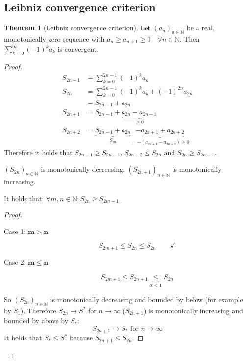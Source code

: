 \documentclass[a4paper,landscape,twocolumn]{article}
\theoremstyle{definition}
\newtheorem{theorem}{Theorem}
\newcommand\seq[1]{{\left(#1\right)}_{n \in \mathbb N}}
\begin{document}
\subsection{Leibniz convergence criterion}
\begin{theorem}[Leibniz convergence criterion]
  Let $\seq{a_n}$ be a real, monotonically zero sequence with $a_n \geq a_{n+1} \geq 0
  \quad\forall n \in \mathbb N$.
  Then $\sum_{k=0}^\infty (-1)^k a_k$ is convergent.
\end{theorem}
\begin{proof}
  \begin{align*}
    S_{2n-1} &= \sum_{k=0}^{2n-1} (-1)^{k} a_k \\
    S_{2n} &= \sum_{k=0}^{2n-1} (-1)^{k} a_k + (-1)^{2n} a_{2n} \\
      &= S_{2n-1} + a_{2n} \\
    S_{2n+1} &= S_{2n-1} + \underbrace{a_{2n} - a_{2n-1}}_{\geq 0} \\
    S_{2n+2} &= \underbrace{S_{2n-1} + a_{2n}}_{S_{2n}} \underbrace{- a_{2n+1} + a_{2n+2}}_{= -(a_{2n+1} - a_{2n+2}) \geq 0}
  \end{align*}
  Therefore it holds that $S_{2n+1} \geq S_{2n-1}$, $S_{2n+2} \leq S_{2n}$ and $S_{2n} \geq S_{2n-1}$.

  $\seq{S_{2n}}$ is monotonically decreasing.
  $\seq{S_{2n+1}}$ is monotonically increasing.

  It holds that: $\forall m,n \in \mathbb N: S_{2n} \geq S_{2m - 1}$.

  \begin{proof}
    \begin{description}
      \item[Case 1: $\mathbf{m > n}$]
        \[ S_{2m+1} \leq S_{2n} \leq S_{2n} \qquad\checkmark \]
      \item[Case 2: $\mathbf{m \leq n}$]
        \[ S_{2m+1} \leq S_{2n+1} \underbrace{\leq}_{\alpha < 1} S_{2n} \]
    \end{description}
    So $\seq{S_{2n}}$ is monotonically decreasing and bounded by below (for example by $S_1$).
    Therefore $S_{2n} \to S^*$ for $n \to \infty$ ($S_{2n+1}$) is monotonically increasing
    and bounded by above by $S_*$:
    \[ S_{2n+1} \to S_* \text{ for } n \to \infty \]
    It holds that $S_* \leq S^*$ because $S_{2n+1} \leq S_{2n}$.
  \end{proof}


\end{proof}
\end{document}
